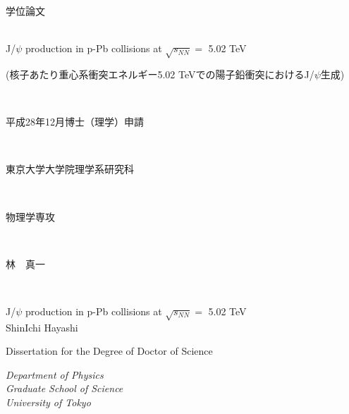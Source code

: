 \documentclass[a4paper,12pt,twoside]{book}
\begin{document}
\begin{titlepage}
\begin{center}
\vspace*{4cm}
\LARGE
\begin{CJK}{UTF8}{ipxm}学位論文\end{CJK}\\

\vspace{2cm}
\LARGE J/$\psi$ production in p-Pb collisions at $\sqrt{s_{NN}}=$ 5.02 TeV \\
\begin{CJK}{UTF8}{ipxm}(核子あたり重心系衝突エネルギー5.02 TeVでの陽子鉛衝突におけるJ/$\psi$生成)\end{CJK}\\

\vspace{2cm}
\begin{CJK}{UTF8}{ipxm}平成28年12月博士（理学）申請\end{CJK}\\

\vspace{4cm}
\begin{CJK}{UTF8}{ipxm}東京大学大学院理学系研究科\end{CJK}\\
\begin{CJK}{UTF8}{ipxm}物理学専攻\end{CJK}\\
\begin{CJK}{UTF8}{ipxm}林　真一\end{CJK}\\


\vspace{1cm}
\date{\today}
\end{center}
\end{titlepage}

\thispagestyle{empty}
\cleardoublepage

\begin{titlepage}
\Large
\begin{center}
\vspace*{4cm}
\LARGE J/$\psi$ production in p-Pb collisions at $\sqrt{s_{NN}}=$ 5.02 TeV \\
\vspace{7cm}
ShinIchi Hayashi

\vspace{4cm}
Dissertation for the Degree of Doctor of Science
\vspace{5mm}

\large
{\it Department of Physics\\
  Graduate School of Science\\
  University of Tokyo}

\end{center}
\end{titlepage}
\end{document}
